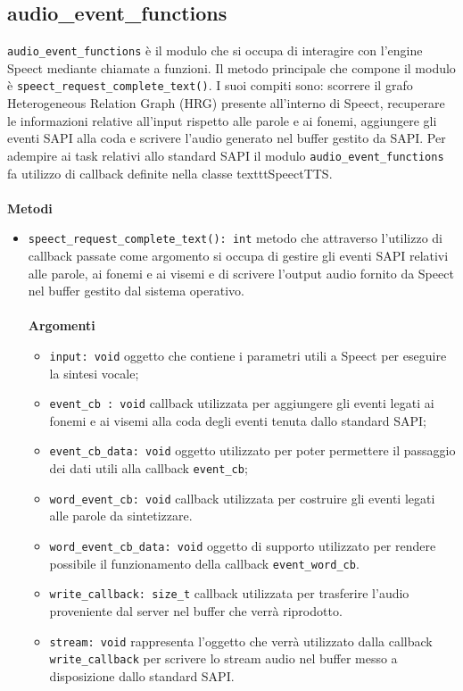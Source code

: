 \subsection{audio\_event\_functions}
\texttt{audio\_event\_functions} è il modulo che si occupa di interagire con l'engine Speect mediante chiamate a funzioni. 
Il metodo principale che compone il modulo è \texttt{speect\_request\_complete\_text()}. I suoi compiti sono: scorrere il grafo Heterogeneous Relation Graph (HRG) presente all'interno di Speect, recuperare le informazioni relative all'input rispetto alle parole e ai fonemi, aggiungere gli eventi SAPI alla coda e scrivere l'audio generato nel buffer gestito da SAPI.
Per adempire ai task relativi allo standard SAPI il modulo \texttt{audio\_event\_functions} fa utilizzo di callback definite nella classe texttt{SpeectTTS}.
\\\\
\textbf{Metodi}
\begin{itemize}
	\item \texttt{speect\_request\_complete\_text(): int} metodo che attraverso l'utilizzo di callback passate come argomento si occupa di gestire gli eventi SAPI relativi alle parole, ai fonemi e ai visemi e di scrivere l'output audio fornito da Speect nel buffer gestito dal sistema operativo.
	\\\\
	\textbf{Argomenti}
	\begin{itemize}
		\item \texttt{input: void} oggetto che contiene i parametri utili a Speect per eseguire la sintesi vocale;
		\item \texttt{event\_cb : void} callback utilizzata per aggiungere gli eventi legati ai fonemi e ai visemi alla coda degli eventi tenuta dallo standard SAPI;
		\item \texttt{event\_cb\_data: void} oggetto utilizzato per poter permettere il passaggio dei dati utili alla callback \texttt{event\_cb};
		\item \texttt{word\_event\_cb: void} callback utilizzata per costruire gli eventi legati alle parole da sintetizzare.
		\item \texttt{word\_event\_cb\_data: void} oggetto di supporto utilizzato per rendere possibile il funzionamento della callback \texttt{event\_word\_cb}.
		\item \texttt{write\_callback: size\_t} callback utilizzata per trasferire l'audio proveniente dal server nel buffer che verrà riprodotto.
		\item \texttt{stream: void} rappresenta l'oggetto che verrà utilizzato dalla callback \texttt{write\_callback} per scrivere lo stream audio nel buffer messo a disposizione dallo standard SAPI.
	\end{itemize}
\end{itemize}
